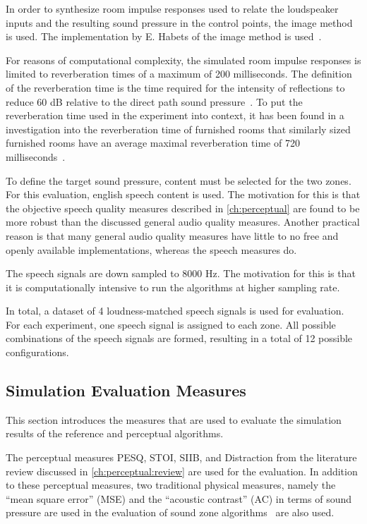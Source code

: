 In order to synthesize room impulse responses used to relate the loudspeaker inputs and the resulting sound pressure 
in the control points, the image method~\cite{allen1979image} is used.
The implementation by E. Habets of the image method is used~\cite{habets2006room}.

For reasons of computational complexity, the simulated room impulse 
responses is limited to reverberation times of a maximum of 200 milliseconds.
The definition of the reverberation time is the time required for the intensity of reflections to reduce 60 dB relative 
to the direct path sound pressure~\cite{habets2006room}. 
To put the reverberation time used in the experiment into context, 
it has been found in a investigation into the reverberation time of furnished rooms
that similarly sized furnished rooms have an average maximal reverberation 
time of 720 milliseconds~\cite{diaz2005reverberation}.

To define the target sound pressure, content must be selected for the two zones.
For this evaluation, english speech content is used.
The motivation for this is that the objective speech quality measures described in 
\autoref{ch:perceptual} are found to be more robust than
the discussed general audio quality measures.
Another practical reason is that many general audio quality measures have 
little to no free and openly available implementations, whereas the speech measures do.

The speech signals are down sampled to 8000 Hz.
The motivation for this is that it is computationally intensive to run the algorithms at higher sampling rate.

In total, a dataset of 4 loudness-matched speech signals is used for evaluation.
For each experiment, one speech signal is assigned to each zone.
All possible combinations of the speech signals are formed, resulting in a total of 12 possible configurations.

\subsection{Simulation Evaluation Measures}
\label{ch:results:methodology:measures}
This section introduces the measures that are used to evaluate the simulation results 
of the reference and perceptual algorithms.

The perceptual measures PESQ, STOI, SIIB, and Distraction 
from the literature review discussed in \autoref{ch:perceptual:review} are used for the evaluation.
In addition to these perceptual measures, two traditional physical measures, namely the ``mean square error'' (MSE) and
the ``acoustic contrast'' (AC) in terms of sound pressure are used in the evaluation of 
sound zone algorithms~\cite{lee2018unified} are also used.


